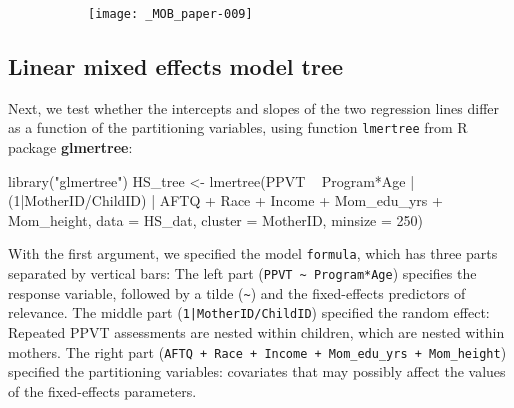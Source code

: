 \documentclass[doc,floatsintext,natbib]{apa7}
\begin{document}
\begin{figure}%
\caption{}
\begin{subfigure}{.7\textwidth}
\texttt{[image: \_MOB\_paper-009]}
\end{subfigure}
\label{fig:global_lmm}
\end{figure}%

\FloatBarrier
\subsection{Linear mixed effects model tree}

Next, we test whether the intercepts and slopes of the two regression lines differ as a function of the partitioning variables, using function \verb|lmertree| from R package \textbf{glmertree}:

\begin{Schunk}
\begin{Sinput}
 library("glmertree")
 HS_tree <- lmertree(PPVT ~ Program*Age | (1|MotherID/ChildID) | AFTQ + Race + 
                       Income + Mom_edu_yrs + Mom_height, 
                     data = HS_dat, cluster = MotherID, minsize = 250)
\end{Sinput}
\end{Schunk}

With the first argument, we specified the model \verb|formula|, which has three parts separated by vertical bars: The left part (\verb|PPVT ~ Program*Age|) specifies the response variable, followed by a tilde (\verb|~|) and the fixed-effects predictors of relevance. The middle part (\texttt{1|MotherID/ChildID}) specified the random effect: Repeated PPVT assessments are nested within children, which are nested within mothers. The right part (\verb|AFTQ + Race + Income + Mom_edu_yrs + Mom_height|) specified the partitioning variables: covariates that may possibly affect the values of the fixed-effects parameters. 
\end{document}
